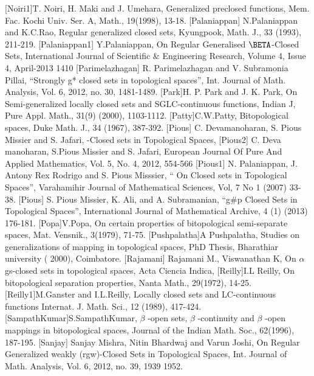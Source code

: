 \begin{thebibliography}{99}
 [Noiri1]T. Noiri, H. Maki and J. Umehara, Generalized preclosed functions, Mem. Fac. Kochi Univ. Ser. A, Math., 19(1998), 13-18.
 [Palaniappan]	N.Palaniappan and K.C.Rao, Regular generalized closed sets, Kyungpook, Math. J., 33 (1993), 	211-219.
 [Palaniappan1]	Y.Palaniappan, On Regular Generalised $\BETA$-Closed Sets,  International Journal of 	Scientific & Engineering Research, Volume 4, Issue 4, April-2013 1410
 [Parimelazhagan]  	R. Parimelazhagan and V. Subramonia Pillai, “Strongly g* closed sets in topological spaces”, 	Int. Journal of Math. Analysis, Vol. 6, 2012, no. 30, 1481-1489.
 [Park]H. P. Park and J. K. Park, On Semi-generalized locally closed sets and SGLC-continuous functions, Indian J, Pure Appl. Math., 31(9) (2000), 1103-1112.
 [Patty]C.W.Patty, Bitopological spaces, Duke Math. J., 34 (1967), 387-392.
 [Pious] C. Devamanoharan, S. Pious Missier and S. Jafari, -Closed sets in Topological Spaces, 
 [Pious2]	C. Deva manoharan, S.Pious Missier and S. Jafari, European Journal Of Pure And 	Applied Mathematics, Vol. 5, No. 4, 2012, 554-566
 [Pious1]	N. Palaniappan, J. Antony Rex Rodrigo and S. Pious Misssier, “ On Closed sets in Topological 	Spaces”, Varahamihir Journal of Mathematical Sciences, Vol, 7 No 1 (2007) 33-38.
 [Pious]	S. Pious Missier, K. Ali, and A. Subramanian, “g#p  Closed Sets in Topological Spaces”, 	International Journal of Mathematical Archive, 4 (1) (2013) 176-181.
 [Popa]V.Popa, On certain properties of bitopological semi-separate spaces, Mat. Vensnik., 3(1979), 71-75.
 [Pushpalatha]A Pushpalatha, Studies on generalizations of mapping in topological spaces, PhD Thesis, Bharathiar university ( 2000), Coimbatore.
 [Rajamani]	Rajamani M., Viswanathan K, On $\alpha$gs-closed sets in topological spaces, Acta Ciencia Indica,
 [Reilly]I.L Reilly, On bitopological separation properties, Nanta Math., 29(1972), 14-25.
 [Reilly1]M.Ganster and I.L.Reilly, Locally closed sets and LC-continuous functions Internat. J. Math. Sci., 12 (1989), 417-424.
 [SampathKumar]S.SampathKumar, $\beta$ -open sets, $\beta$ -continuity and $\beta$ -open mappings in bitopological spaces, Journal of the Indian Math. Soc., 62(1996), 187-195.
 [Sanjay] Sanjay Mishra, Nitin Bhardwaj and Varun Joshi, On Regular Generalized weakly (rgw)-Closed Sets in Topological Spaces, Int. Journal of Math. Analysis, Vol. 6, 2012, no. 39, 1939 1952.

\end{thebibliography}
